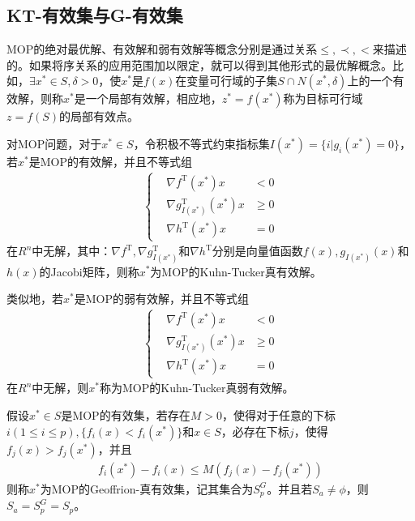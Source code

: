    \subsection{KT-有效集与G-有效集}
        \par
        MOP的绝对最优解、有效解和弱有效解等概念分别是通过关系$\le,\prec,<$来描述的。如果将序关系的应用范围加以限定，就可以得到其他形式的最优解概念。比如，$\exists x^* \in S,\delta > 0$，使$x^*$是$f(x)$在变量可行域的子集$S\cap N(x^*,\delta)$上的一个有效解，则称$x^*$是一个局部有效解，相应地，$z^*=f(x^*)$称为目标可行域$z=f(S)$的局部有效点。
        \begin{definition}
        对MOP问题，对于$x^* \in S$，令积极不等式约束指标集$I(x^*)=\{i|g_i(x^*)=0\}$，若$x^*$是MOP的有效解，并且不等式组
        \begin{align*}
        \left\{
        \begin{aligned}
        &\nabla f^\mathrm{T}(x^*)x & < 0\\
        &\nabla g_{I(x^*)}^\mathrm{T}(x^*)x & \geqslant 0\\
        &\nabla h^\mathrm{T}(x^*)x& =0
        \end{aligned}
        \right.
        \end{align*}
        在$R^n$中无解，其中：$\nabla f^\mathrm{T} ,\nabla g_{I(x^*)}^\mathrm{T} $和$\nabla h^\mathrm{T} $分别是向量值函数$f(x),g_{I(x^*)}(x)$和$h(x)$的Jacobi矩阵，则称$x^*$为MOP的Kuhn-Tucker真有效解。
        \end{definition}
        \par
        类似地，若$x^*$是MOP的弱有效解，并且不等式组
        \begin{align*}
        \left\{
        \begin{aligned}
        &\nabla f^\mathrm{T}(x^*)x & < 0\\
        &\nabla g_{I(x^*)}^\mathrm{T}(x^*)x & \geqslant 0\\
        &\nabla h^\mathrm{T}(x^*)x& =0
        \end{aligned}
        \right.
        \end{align*}
        在$R^n$中无解，则$x^*$称为MOP的Kuhn-Tucker真弱有效解。
        \begin{definition}
        假设$x^* \in S$是MOP的有效集，若存在$M>0$，使得对于任意的下标$i(1\leqslant i \leqslant p),\{f_i(x)<f_i(x^*)\}$和$x\in S$，必存在下标$j$，使得$f_j(x)>f_j(x^*)$，并且
                \begin{align*}
                f_i(x^*)-f_i(x)\leqslant M(f_j(x)-f_j(x^*))
                \end{align*}
        则称$x^*$为MOP的Geoffrion-真有效集，记其集合为$S_p^G$。并且若$S_a\neq \phi$，则$S_a=S_p^G=S_p$。
        \end{definition}
